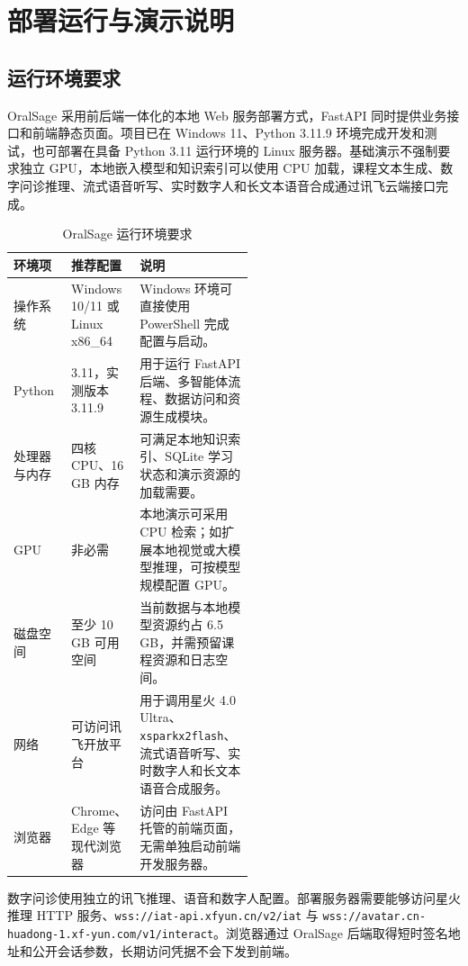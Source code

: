 \chapter{部署运行与演示说明}
\label{sec:deployment-demo}

\section{运行环境要求}

OralSage 采用前后端一体化的本地 Web 服务部署方式，FastAPI 同时提供业务接口和前端静态页面。项目已在 Windows 11、Python 3.11.9 环境完成开发和测试，也可部署在具备 Python 3.11 运行环境的 Linux 服务器。基础演示不强制要求独立 GPU，本地嵌入模型和知识索引可以使用 CPU 加载，课程文本生成、数字问诊推理、流式语音听写、实时数字人和长文本语音合成通过讯飞云端接口完成。

\begin{table}[H]
  \centering
  \caption{OralSage 运行环境要求}
  \label{tab:runtime-requirements}
  \begin{tabularx}{\linewidth}{p{0.24\linewidth}p{0.29\linewidth}X}
    \toprule
    环境项 & 推荐配置 & 说明 \\
    \midrule
    操作系统 & Windows 10/11 或 Linux x86\_64 & Windows 环境可直接使用 PowerShell 完成配置与启动。 \\
    Python & 3.11，实测版本 3.11.9 & 用于运行 FastAPI 后端、多智能体流程、数据访问和资源生成模块。 \\
    处理器与内存 & 四核 CPU、16 GB 内存 & 可满足本地知识索引、SQLite 学习状态和演示资源的加载需要。 \\
    GPU & 非必需 & 本地演示可采用 CPU 检索；如扩展本地视觉或大模型推理，可按模型规模配置 GPU。 \\
    磁盘空间 & 至少 10 GB 可用空间 & 当前数据与本地模型资源约占 6.5 GB，并需预留课程资源和日志空间。 \\
    网络 & 可访问讯飞开放平台 & 用于调用星火 4.0 Ultra、\texttt{xsparkx2flash}、流式语音听写、实时数字人和长文本语音合成服务。 \\
    浏览器 & Chrome、Edge 等现代浏览器 & 访问由 FastAPI 托管的前端页面，无需单独启动前端开发服务器。 \\
    \bottomrule
  \end{tabularx}
\end{table}

数字问诊使用独立的讯飞推理、语音和数字人配置。部署服务器需要能够访问星火推理 HTTP 服务、\texttt{wss://iat-api.xfyun.cn/v2/iat} 与 \texttt{wss://avatar.cn-huadong-1.xf-yun.com/v1/interact}。浏览器通过 OralSage 后端取得短时签名地址和公开会话参数，长期访问凭据不会下发到前端。

